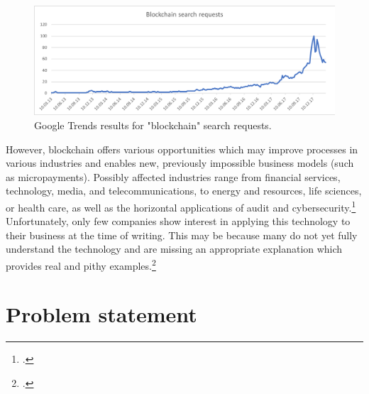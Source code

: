 \begin{figure}
    \centering
    \includegraphics[width=\textwidth]{latex-vorlage_v1.5/graphics/BCRQ.png}
    \caption[Google Trends results for "blockchain" search requests.]{Google Trends results for "blockchain" search requests.\protect\footnotemark}
    \label{fig:SearchRequests}
\end{figure}

However, blockchain offers various opportunities which may improve processes in various industries and enables new, previously impossible business models (such as micropayments). Possibly affected industries range from financial services, technology, media, and telecommunications, to energy and resources, life sciences, or health care, as well as the horizontal applications of audit and cybersecurity.\footcite[Cf.][]{SchatskybitcoinBlockchaincoming2015} Unfortunately, only few companies show interest in applying this technology to their business at the time of writing. This may be because many do not yet fully understand the technology and are missing an appropriate explanation which provides real and pithy examples.\footcite[Cf.][P88]{BjoernPaulewicz_Interview}



\section{Problem statement} \label{sec:Problem}

